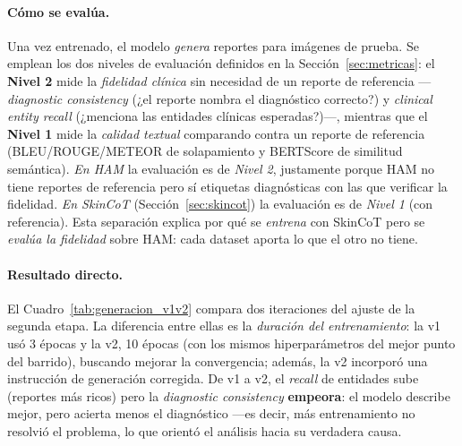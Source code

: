 \documentclass[11pt, a4paper]{article}
\begin{document}
\paragraph{Cómo se evalúa.} Una vez entrenado, el modelo \emph{genera} reportes para imágenes de prueba.
Se emplean los dos niveles de evaluación definidos en la Sección~\ref{sec:metricas}: el \textbf{Nivel 2}
mide la \emph{fidelidad clínica} sin necesidad de un reporte de referencia —\emph{diagnostic consistency}
(¿el reporte nombra el diagnóstico correcto?) y \emph{clinical entity recall} (¿menciona las entidades
clínicas esperadas?)—, mientras que el \textbf{Nivel 1} mide la \emph{calidad textual} comparando contra
un reporte de referencia (BLEU/ROUGE/METEOR de solapamiento y BERTScore de similitud semántica).
\emph{En HAM} la evaluación es de \emph{Nivel 2}, justamente porque HAM no tiene reportes de referencia
pero sí etiquetas diagnósticas con las que verificar la fidelidad. \emph{En SkinCoT}
(Sección~\ref{sec:skincot}) la evaluación es de \emph{Nivel 1} (con referencia). Esta separación explica por qué se \emph{entrena} con SkinCoT pero se
\emph{evalúa la fidelidad} sobre HAM: cada dataset aporta lo que el otro no tiene.

\paragraph{Resultado directo.} El Cuadro~\ref{tab:generacion_v1v2} compara dos iteraciones del ajuste de
la segunda etapa. La diferencia entre ellas es la \emph{duración del entrenamiento}: la v1 usó 3 épocas
y la v2, 10 épocas (con los mismos hiperparámetros del mejor punto del barrido), buscando mejorar la
convergencia; además, la v2 incorporó una instrucción de generación corregida. De v1 a v2, el
\emph{recall} de entidades sube (reportes más ricos) pero la \emph{diagnostic consistency}
\textbf{empeora}: el modelo describe mejor, pero acierta menos el diagnóstico —es decir, más
entrenamiento no resolvió el problema, lo que orientó el análisis hacia su verdadera causa.
\end{document}

